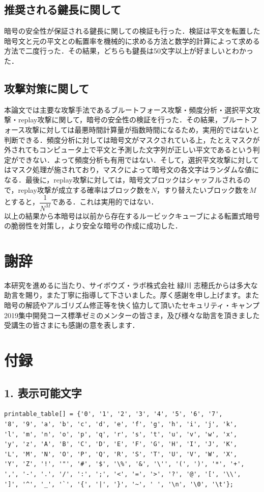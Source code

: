 \documentclass[titlepage]{jarticle}
\begin{document}
\subsection{推奨される鍵長に関して}
暗号の安全性が保証される鍵長に関しての検証も行った．検証は平文を転置した暗号文と元の平文との転置率を機械的に求める方法と数学的計算によって求める方法で二度行った．その結果，どちらも鍵長は50文字以上が好ましいとわかった．

\subsection{攻撃対策に関して}
本論文では主要な攻撃手法であるブルートフォース攻撃・頻度分析・選択平文攻撃・replay攻撃に関して，暗号の安全性の検証を行った．その結果，ブルートフォース攻撃に対しては最悪時間計算量が指数時間になるため，実用的ではないと判断できる．頻度分析に対しては暗号文がマスクされている上，たとえマスクが外されてもコンピュータ上で平文と予測した文字列が正しい平文であるという判定ができない．よって頻度分析も有用ではない．そして，選択平文攻撃に対してはマスク処理が施されており，マスクによって暗号文の各文字はランダムな値になる．最後に，replay攻撃に対しては，暗号文ブロックはシャッフルされるので，replay攻撃が成立する確率はブロック数を\(N\)，すり替えたいブロック数を\(M\)とすると，\(\dfrac{1}{N^M}\)である．これは実用的ではない．\\
以上の結果から本暗号は以前から存在するルービックキューブによる転置式暗号の脆弱性を対策し，より安全な暗号の作成に成功した．

\section{謝辞}
本研究を進めるに当たり、サイボウズ・ラボ株式会社 緑川 志穂氏からは多大な助言を賜り，また丁寧に指導して下さいました。厚く感謝を申し上げます。また暗号の解読やアルゴリズム修正等を快く協力して頂いたセキュリティ・キャンプ2019集中開発コース標準ゼミのメンターの皆さま，及び様々な助言を頂きました受講生の皆さまにも感謝の意を表します．

\section{付録}
\subsection{1. 表示可能文字}
\begin{verbatim}
printable_table[] = {'0', '1', '2', '3', '4', '5', '6', '7', 
'8', '9', 'a', 'b', 'c', 'd', 'e', 'f', 'g', 'h', 'i', 'j', 'k', 
'l', 'm', 'n', 'o', 'p', 'q', 'r', 's', 't', 'u', 'v', 'w', 'x', 
'y', 'z', 'A', 'B', 'C', 'D', 'E', 'F', 'G', 'H', 'I', 'J', 'K', 
'L', 'M', 'N', 'O', 'P', 'Q', 'R', 'S', 'T', 'U', 'V', 'W', 'X', 
'Y', 'Z', '!', '"', '#', '$', '\%', '&', '\'', '(', ')', '*', '+', 
',', '-', '.', '/', ':', ';', '<', '=', '>', '?', '@', '[', '\\', 
']', '^', '_', '`', '{', '|', '}', '~', ' ', '\n', '\0', '\t'};
\end{verbatim}
\end{document}
